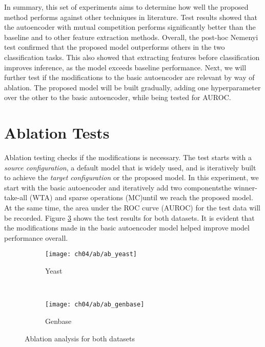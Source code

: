 \par In summary, this set of experiments aims to determine how well the
proposed method performs against other techniques in literature. Test results
showed that the autoencoder with mutual competition performs significantly
better than the baseline and to other feature extraction methods. Overall, the
post-hoc Nemenyi test confirmed that the proposed model outperforms others in
the two classification tasks. This also showed that extracting features before
classification improves inference, as the model exceeds baseline performance.
Next, we will further test if the modifications to the basic autoencoder are
relevant by way of ablation. The proposed model will be built gradually,
adding one hyperparameter over the other to the basic autoencoder, while being
tested for AUROC.  




\section{Ablation Tests}
\label{AblationTest}

\par Ablation testing checks if the modifications is necessary. The test starts
with a \textit{source configuration}, a default model that is widely used, and
is iteratively built to achieve the \textit{target configuration} or the
proposed model. In this experiment, we start with the basic autoencoder and
iteratively add two components\textemdash the winner-take-all (WTA) and sparse
operations (MC)\textemdash until we reach the proposed model. At the same time,
the area under the ROC curve (AUROC) for the test data will be recorded. Figure
\ref{results:ab_analysis} shows the test results for both datasets. It is
evident that the modifications made in the basic autoencoder model helped
improve model performance overall.   

\begin{figure}[h]
    \centering
    \begin{subfigure}[b]{0.45\textwidth}
        \texttt{[image: ch04/ab/ab\_yeast]}
        \caption{Yeast}
        \label{results:fi_yeast_base}
    \end{subfigure}
    ~ %
    \begin{subfigure}[b]{0.45\textwidth}
        \texttt{[image: ch04/ab/ab\_genbase]}
        \caption{Genbase}
        \label{results:fi_genbase_base}
    \end{subfigure}
    \caption{Ablation analysis for both datasets}
    \label{results:ab_analysis}
\end{figure}
